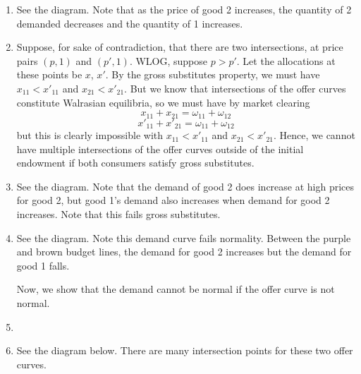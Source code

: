 \documentclass[10pt,letter]{article}
\begin{document}
\begin{enumerate}[label=(\alph*)]
\item See the diagram. Note that as the price of good 2 increases, the quantity of 2 demanded decreases and the quantity of 1 increases.

\item Suppose, for sake of contradiction, that there are two intersections, at price pairs $(p, 1)$ and $(p', 1)$. WLOG, suppose $p > p'$. Let the allocations at these points be $x$, $x'$. By the gross substitutes property, we must have $x_{11} < x'_{11}$ and $x_{21} < x'_{21}$. But we know that intersections of the offer curves constitute Walrasian equilibria, so we must have by market clearing
\[ x_{11} + x_{21} = \omega_{11} + \omega_{12}  \]
\[ x'_{11} + x'_{21} = \omega_{11} + \omega_{12}  \]
but this is clearly impossible with $x_{11} < x'_{11}$ and $x_{21} < x'_{21}$. Hence, we cannot have multiple intersections of the offer curves outside of the initial endowment if both consumers satisfy gross substitutes.
\item See the diagram. Note that the demand of good 2 does increase at high prices for good 2, but good 1's demand also increases when demand for good 2 increases. Note that this fails gross substitutes.

\item See the diagram. Note this demand curve fails normality. Between the purple and brown budget lines, the demand for good 2 increases but the demand for good 1 falls.

Now, we show that the demand cannot be normal if the offer curve is not normal.
\item
\item See the diagram below. There are many intersection points for these two offer curves.


\end{enumerate}
\end{document}
